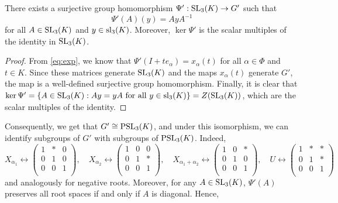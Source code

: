 \begin{theorem}
    There exists a surjective group homomorphism $\Psi':\mathrm{SL}_3(K)\to G'$ such that 
    $$\Psi'(A)(y)=AyA^{-1}$$
    for all $A\in\mathrm{SL}_3(K)$ and $y\in\mathrm{sl}_3(K)$. Moreover, $\ker\Psi'$ is the scalar multiples of the identity in $\mathrm{SL}_3(K)$.
\end{theorem}
\begin{proof}
    From \eqref{eq:exp}, we know that $\Psi'(I+te_\alpha)=x_\alpha(t)$ for all $\alpha\in\Phi$ and $t\in K$. Since these matrices generate $\mathrm{SL}_3(K)$ and the maps $x_\alpha(t)$ generate $G'$, the map is a well-defined surjective group homomorphism. Finally, it is clear that $\ker\Psi'=\{A\in\mathrm{SL}_3(K):Ay=yA\text{ for all }y\in\mathrm{sl}_3(K)\}=Z(\mathrm{SL}_3(K))$, which are the scalar multiples of the identity.
\end{proof}

Consequently, we get that $G'\cong\mathrm{PSL}_3(K)$, and under this isomorphism, we can identify subgroups of $G'$ with subgroups of $\mathrm{PSL}_3(K)$. Indeed,
\begin{equation*}
    X_{\alpha_1}\longleftrightarrow\begin{pmatrix}
        1 & * & 0\\
        0 & 1 & 0\\
        0 & 0 & 1\\
    \end{pmatrix},\quad X_{\alpha_2}\longleftrightarrow\begin{pmatrix}
        1 & 0 & 0\\
        0 & 1 & *\\
        0 & 0 & 1\\
    \end{pmatrix},\quad X_{\alpha_1+\alpha_2}\longleftrightarrow\begin{pmatrix}
        1 & 0 & *\\
        0 & 1 & 0\\
        0 & 0 & 1\\
    \end{pmatrix},\quad U\longleftrightarrow\begin{pmatrix}
        1 & * & *\\
        0 & 1 & *\\
        0 & 0 & 1\\
    \end{pmatrix}
\end{equation*}
and analogously for negative roots. Moreover, for any $A\in\mathrm{SL}_3(K)$, $\Psi'(A)$ preserves all root spaces if and only if $A$ is diagonal. Hence,

